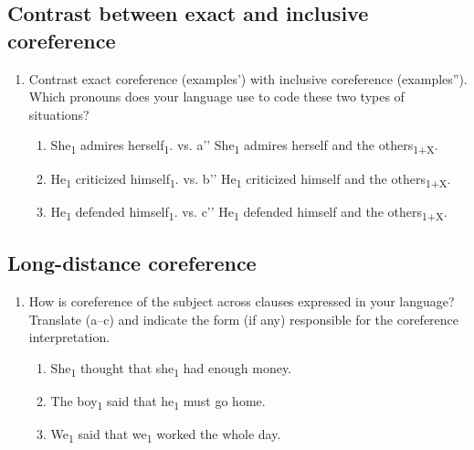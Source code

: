 \documentclass[output=paper]{langscibook}
\begin{document}
\subsection*{Contrast between exact and inclusive coreference}
\begin{enumerate}[resume]
\item Contrast exact coreference (examples') with inclusive coreference (examples”). Which pronouns does your language use to code these two types of situations? 

\begin{enumerate}[label=\alph*'.]
\item She\textsubscript{1} admires herself\textsubscript{1}.   vs.   a’’ She\textsubscript{1} admires herself and the others\textsubscript{1+X}. 
\item He\textsubscript{1} criticized himself\textsubscript{1}.   vs.   b’’ He\textsubscript{1} criticized himself and the others\textsubscript{1+X}. 
\item He\textsubscript{1} defended himself\textsubscript{1}.   vs.   c’’ He\textsubscript{1} defended himself and the others\textsubscript{1+X}. 
\end{enumerate}
\end{enumerate}

\subsection*{Long-distance coreference}
\begin{enumerate}[resume]
\item How is coreference of the subject across clauses expressed in your language? Translate (a--c) and indicate the form (if any) responsible for the coreference interpretation. 
\begin{enumerate}[label=\alph*.]
\item She\textsubscript{1} thought that she\textsubscript{1} had enough money. 
\item The boy\textsubscript{1} said that he\textsubscript{1} must go home. 
\item We\textsubscript{1} said that we\textsubscript{1} worked the whole day. 
\end{enumerate}
\end{enumerate}

\printbibliography[heading=subbibliography,notkeyword=this]
\end{document}
